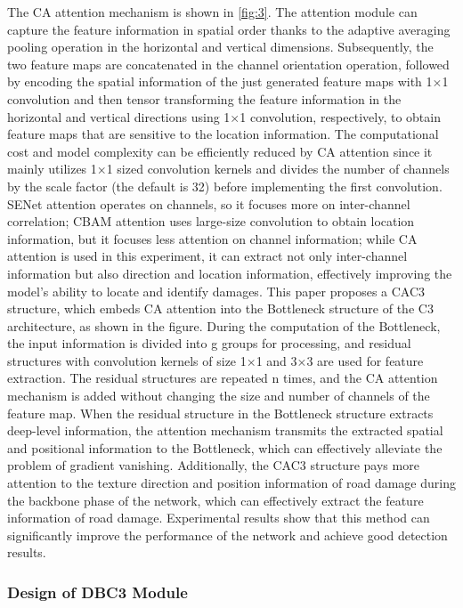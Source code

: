 \documentclass[sensors,article,submit,moreauthors]{Definitions/mdpi}
\begin{document}
    The CA attention mechanism is shown in \autoref{fig:3}. The attention module can capture the feature information in spatial order thanks to the adaptive averaging pooling operation in the horizontal and vertical dimensions. Subsequently, the two feature maps are concatenated in the channel orientation operation, followed by encoding the spatial information of the just generated feature maps with 1$\times$1 convolution and then tensor transforming the feature information in the horizontal and vertical directions using 1$\times$1 convolution, respectively, to obtain feature maps that are sensitive to the location information. The computational cost and model complexity can be efficiently reduced by CA attention since it mainly utilizes 1×1 sized convolution kernels and divides the number of channels by the scale factor (the default is 32) before implementing the first convolution.
    SENet attention\citep{Hu_2018_CVPR} operates on channels, so it focuses more on inter-channel correlation; CBAM attention\citep{Woo_2018_ECCV} uses large-size convolution to obtain location information, but it focuses less attention on channel information; while CA attention is used in this experiment, it can extract not only inter-channel information but also direction and location information, effectively improving the model's ability to locate and identify damages.
    This paper proposes a CAC3 structure, which embeds CA attention into the Bottleneck structure of the C3 architecture, as shown in the figure. During the computation of the Bottleneck, the input information is divided into g groups for processing, and residual structures with convolution kernels of size 1×1 and 3×3 are used for feature extraction. The residual structures are repeated n times, and the CA attention mechanism is added without changing the size and number of channels of the feature map. When the residual structure in the Bottleneck structure extracts deep-level information, the attention mechanism transmits the extracted spatial and positional information to the Bottleneck, which can effectively alleviate the problem of gradient vanishing. Additionally, the CAC3 structure pays more attention to the texture direction and position information of road damage during the backbone phase of the network, which can effectively extract the feature information of road damage. Experimental results show that this method can significantly improve the performance of the network and achieve good detection results.

    \subsubsection{Design of DBC3 Module}
\end{document}
